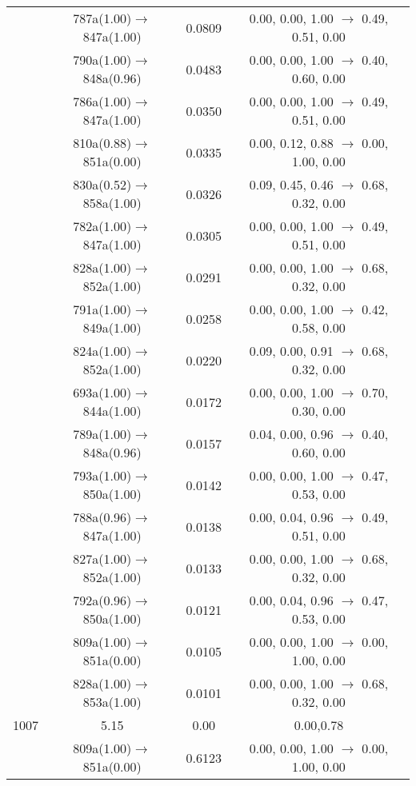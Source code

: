 \documentclass[10pt,a4paper]{article}
\begin{document}
\begin{longtable}{c|c|c|c}
 	& 787a(1.00)$\rightarrow$847a(1.00) &	 0.0809 &	 0.00, 0.00, 1.00 $\rightarrow$ 0.49, 0.51, 0.00 \\ 
 	& 790a(1.00)$\rightarrow$848a(0.96) &	 0.0483 &	 0.00, 0.00, 1.00 $\rightarrow$ 0.40, 0.60, 0.00 \\ 
 	& 786a(1.00)$\rightarrow$847a(1.00) &	 0.0350 &	 0.00, 0.00, 1.00 $\rightarrow$ 0.49, 0.51, 0.00 \\ 
 	& 810a(0.88)$\rightarrow$851a(0.00) &	 0.0335 &	 0.00, 0.12, 0.88 $\rightarrow$ 0.00, 1.00, 0.00 \\ 
 	& 830a(0.52)$\rightarrow$858a(1.00) &	 0.0326 &	 0.09, 0.45, 0.46 $\rightarrow$ 0.68, 0.32, 0.00 \\ 
 	& 782a(1.00)$\rightarrow$847a(1.00) &	 0.0305 &	 0.00, 0.00, 1.00 $\rightarrow$ 0.49, 0.51, 0.00 \\ 
 	& 828a(1.00)$\rightarrow$852a(1.00) &	 0.0291 &	 0.00, 0.00, 1.00 $\rightarrow$ 0.68, 0.32, 0.00 \\ 
 	& 791a(1.00)$\rightarrow$849a(1.00) &	 0.0258 &	 0.00, 0.00, 1.00 $\rightarrow$ 0.42, 0.58, 0.00 \\ 
 	& 824a(1.00)$\rightarrow$852a(1.00) &	 0.0220 &	 0.09, 0.00, 0.91 $\rightarrow$ 0.68, 0.32, 0.00 \\ 
 	& 693a(1.00)$\rightarrow$844a(1.00) &	 0.0172 &	 0.00, 0.00, 1.00 $\rightarrow$ 0.70, 0.30, 0.00 \\ 
 	& 789a(1.00)$\rightarrow$848a(0.96) &	 0.0157 &	 0.04, 0.00, 0.96 $\rightarrow$ 0.40, 0.60, 0.00 \\ 
 	& 793a(1.00)$\rightarrow$850a(1.00) &	 0.0142 &	 0.00, 0.00, 1.00 $\rightarrow$ 0.47, 0.53, 0.00 \\ 
 	& 788a(0.96)$\rightarrow$847a(1.00) &	 0.0138 &	 0.00, 0.04, 0.96 $\rightarrow$ 0.49, 0.51, 0.00 \\ 
 	& 827a(1.00)$\rightarrow$852a(1.00) &	 0.0133 &	 0.00, 0.00, 1.00 $\rightarrow$ 0.68, 0.32, 0.00 \\ 
 	& 792a(0.96)$\rightarrow$850a(1.00) &	 0.0121 &	 0.00, 0.04, 0.96 $\rightarrow$ 0.47, 0.53, 0.00 \\ 
 	& 809a(1.00)$\rightarrow$851a(0.00) &	 0.0105 &	 0.00, 0.00, 1.00 $\rightarrow$ 0.00, 1.00, 0.00 \\ 
 	& 828a(1.00)$\rightarrow$853a(1.00) &	 0.0101 &	 0.00, 0.00, 1.00 $\rightarrow$ 0.68, 0.32, 0.00 \\ 
 \hline1007 &	 5.15 &	 0.00 &	 0.00,0.78 \\ 
  	& 809a(1.00)$\rightarrow$851a(0.00) &	 0.6123 &	 0.00, 0.00, 1.00 $\rightarrow$ 0.00, 1.00, 0.00 \\ 

\end{longtable}
\end{document}
